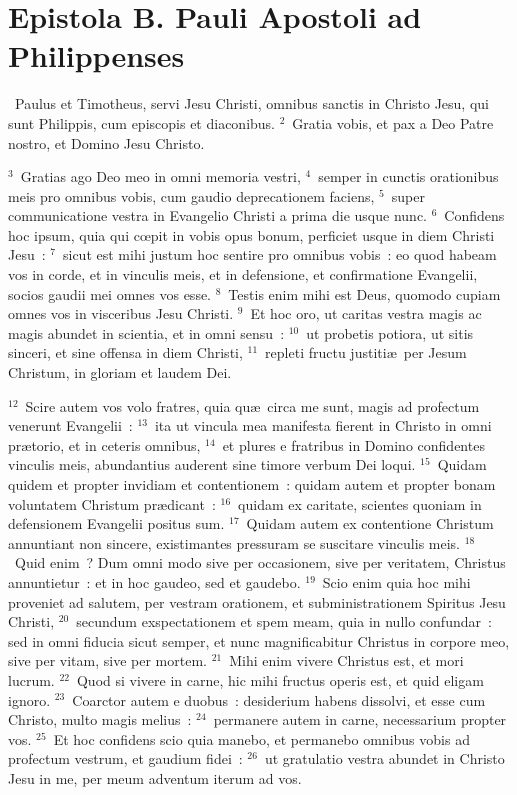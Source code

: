 {\centering \section*{Epistola B. Pauli Apostoli ad Philippenses}}\thispagestyle{empty}

~\lettrine[lines=10,image=true,loversize=0.05,lraise=-0.03]{P}{}aulus et Timotheus, servi Jesu Christi, omnibus sanctis in Christo Jesu, qui sunt Philippis, cum episcopis et diaconibus.
${}^{2}$~Gratia vobis, et pax a Deo Patre nostro, et Domino Jesu Christo.


${}^{3}$~Gratias ago Deo meo in omni memoria vestri,
${}^{4}$~semper in cunctis orationibus meis pro omnibus vobis, cum gaudio deprecationem faciens,
${}^{5}$~super communicatione vestra in Evangelio Christi a prima die usque nunc.
${}^{6}$~Confidens hoc ipsum, quia qui cœpit in vobis opus bonum, perficiet usque in diem Christi Jesu~:
${}^{7}$~sicut est mihi justum hoc sentire pro omnibus vobis~: eo quod habeam vos in corde, et in vinculis meis, et in defensione, et confirmatione Evangelii, socios gaudii mei omnes vos esse.
${}^{8}$~Testis enim mihi est Deus, quomodo cupiam omnes vos in visceribus Jesu Christi.
${}^{9}$~Et hoc oro, ut caritas vestra magis ac magis abundet in scientia, et in omni sensu~:
${}^{10}$~ut probetis potiora, ut sitis sinceri, et sine offensa in diem Christi,
${}^{11}$~repleti fructu justiti\ae\ per Jesum Christum, in gloriam et laudem Dei.


${}^{12}$~Scire autem vos volo fratres, quia qu\ae\ circa me sunt, magis ad profectum venerunt Evangelii~:
${}^{13}$~ita ut vincula mea manifesta fierent in Christo in omni pr\ae torio, et in ceteris omnibus,
${}^{14}$~et plures e fratribus in Domino confidentes vinculis meis, abundantius auderent sine timore verbum Dei loqui.
${}^{15}$~Quidam quidem et propter invidiam et contentionem~: quidam autem et propter bonam voluntatem Christum pr\ae dicant~:
${}^{16}$~quidam ex caritate, scientes quoniam in defensionem Evangelii positus sum.
${}^{17}$~Quidam autem ex contentione Christum annuntiant non sincere, existimantes pressuram se suscitare vinculis meis.
${}^{18}$~Quid enim~? Dum omni modo sive per occasionem, sive per veritatem, Christus annuntietur~: et in hoc gaudeo, sed et gaudebo.
${}^{19}$~Scio enim quia hoc mihi proveniet ad salutem, per vestram orationem, et subministrationem Spiritus Jesu Christi,
${}^{20}$~secundum exspectationem et spem meam, quia in nullo confundar~: sed in omni fiducia sicut semper, et nunc magnificabitur Christus in corpore meo, sive per vitam, sive per mortem.
${}^{21}$~Mihi enim vivere Christus est, et mori lucrum.
${}^{22}$~Quod si vivere in carne, hic mihi fructus operis est, et quid eligam ignoro.
${}^{23}$~Coarctor autem e duobus~: desiderium habens dissolvi, et esse cum Christo, multo magis melius~:
${}^{24}$~permanere autem in carne, necessarium propter vos.
${}^{25}$~Et hoc confidens scio quia manebo, et permanebo omnibus vobis ad profectum vestrum, et gaudium fidei~:
${}^{26}$~ut gratulatio vestra abundet in Christo Jesu in me, per meum adventum iterum ad vos.


